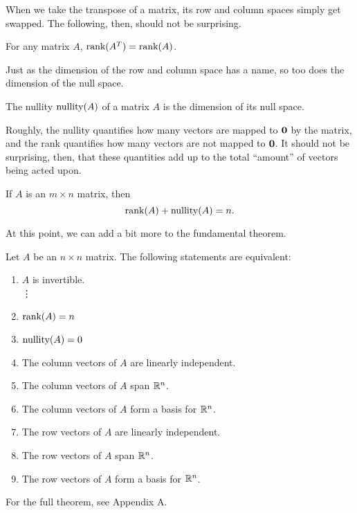 \documentclass[../m73main.tex]{chapters}
\begin{document}
When we take the transpose of a matrix, its row and column spaces simply get swapped.
The following, then, should not be surprising.

\begin{theorem}
	For any matrix $A$, $\textrm{rank}(A^T) = \textrm{rank}(A)$.
\end{theorem}

Just as the dimension of the row and column space has a name, so too does the dimension of the null space.

\begin{definition}[Nullity]
	The nullity $\textrm{nullity}(A)$ of a matrix $A$ is the dimension of its null space.
\end{definition}

Roughly, the nullity quantifies how many vectors are mapped to $\mathbf{0}$ by the matrix, and the rank quantifies how many vectors are not mapped to $\mathbf{0}$.
It should not be surprising, then, that these quantities add up to the total ``amount'' of vectors being acted upon.

\begin{theorem}
	If $A$ is an $m\times n$ matrix, then
	\[ \textrm{rank}(A) + \textrm{nullity}(A) = n. \]
\end{theorem}

At this point, we can add a bit more to the fundamental theorem.

\begin{theorem}
	Let $A$ be an $n\times n$ matrix.
	The following statements are equivalent:
	\begin{enumerate}[label=(\alph*)]
		\item $A$ is invertible. \\
		\phantom{~}\hspace{-19.5pt} \vdots
		\setcounter{enumi}{5}		
		\item $\textrm{rank}(A) = n$
		\item $\textrm{nullity}(A) = 0$
		\item The column vectors of $A$ are linearly independent.
		\item The column vectors of $A$ span $\mathbb{R}^n$.
		\item The column vectors of $A$ form a basis for $\mathbb{R}^n$.
		\item The row vectors of $A$ are linearly independent.
		\item The row vectors of $A$ span $\mathbb{R}^n$.
		\item The row vectors of $A$ form a basis for $\mathbb{R}^n$.
	\end{enumerate}
	For the full theorem, see Appendix A.
\end{theorem}
\end{document}

